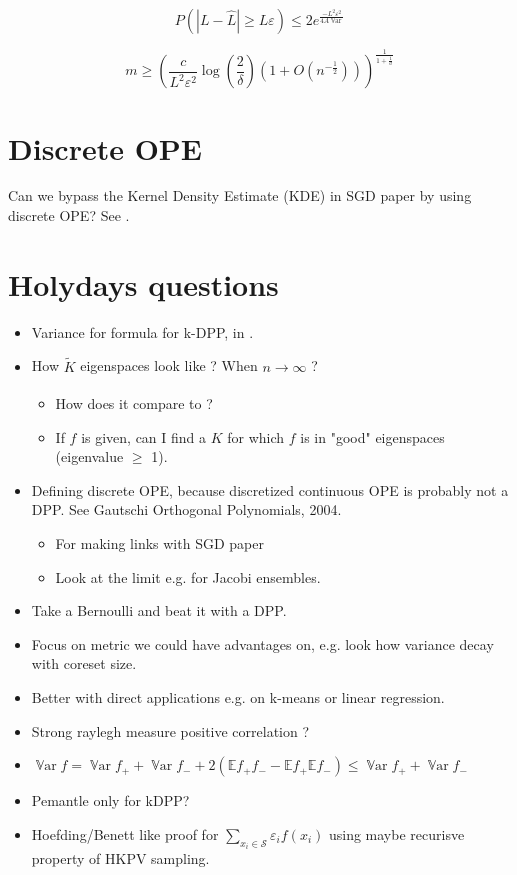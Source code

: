 \documentclass{article} %
\renewcommand{\epsilon}{\varepsilon}
\newcommand{\EE}{\mathbb{E}}
\newcommand{\Var}{\operatorname{\mathbb V ar}}
\newcommand{\1}{\mathds{1}} %
\theoremstyle{definition} %
\begin{document}
 $$P( |L -\hat L| \geq L\epsilon ) \leq 2e^{\frac{-L^2\epsilon ^{2}}{4A \Var} }$$



$$m \geq \left( \frac{c}{L^{2}\varepsilon ^{2}}\log \left( \frac{2}{\delta }\right) \left( 1+O\left( n^{-\frac{1}{2}}\right) \right) \right) ^{\frac{1}{1+\frac{1}{d}}}$$

\section{Discrete OPE}
\begin{tcolorbox}
	Can we bypass the Kernel Density Estimate (KDE) in SGD paper by using discrete OPE? See \cite{gautschi2004ope}.
	
\end{tcolorbox}




\section{Holydays questions}
\begin{itemize}
	\item Variance for formula for k-DPP, in \cite{zhang2017dppminibatch}.
	\item How $\tilde K$ eigenspaces look like ? When $n \xrightarrow[]{} \infty$ ?
	\begin{itemize}
		\item How does it compare to \cite{bardenet2020mcdpp} ?
		\item If $f$ is given, can I find a $K$ for which $f$ is in "good" eigenspaces (eigenvalue $\geq$ 1).
	\end{itemize}
	\item Defining discrete OPE, because discretized continuous OPE is probably not a DPP. See Gautschi Orthogonal Polynomials, 2004.
	\begin{itemize}
		\item For making links with SGD paper \cite{bardenet2021sgddpp}
		\item Look at the limit e.g. for Jacobi ensembles. 
	\end{itemize}
\end{itemize}
\begin{itemize}
	\item Take a Bernoulli and beat it with a DPP.
	\item Focus on metric we could have advantages on, e.g. look how variance decay with coreset size. 
	\item Better with direct applications e.g. on k-means or linear regression.
\end{itemize}
\begin{itemize}
	\item Strong raylegh measure positive correlation ?
	\item $\Var f = \Var f_+ + \Var f_- + 2 (\EE f_+ f_- - \EE f_+ \EE f_-)\leq \Var f_+ + \Var f_-$
	\item Pemantle only for kDPP?
	\item Hoefding/Benett like proof for $\sum_{x_i \in \mathcal S} \epsilon_i f(x_i)$ using maybe recurisve property of HKPV sampling.
\end{itemize}

	\vfill
	
	
	\printbibliography
%	 
%	 
	
\end{document}
